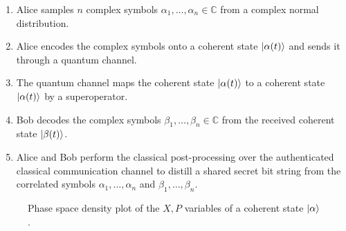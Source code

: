 \begin{enumerate}
	\item Alice samples $n$ complex symbols $\alpha_1,\dots,\alpha_n\in\mathbb{C}$ from a complex normal distribution.
	\item Alice encodes the complex symbols onto a coherent state $\ket{\alpha(t)}$ and sends it through a quantum channel.
	\item The quantum channel maps the coherent state $\ket{\alpha(t)}$ to a coherent state $\ket{\alpha(t)}$ by a superoperator.
	\item Bob decodes the complex symbols $\beta_1,\dots,\beta_n\in\mathbb{C}$ from the received coherent state $\ket{\beta(t)}$.
	\item Alice and Bob perform the classical post-processing over the authenticated classical communication channel to distill a shared secret bit string from the correlated symbols $\alpha_1,\dots,\alpha_n$ and $\beta_1,\dots,\beta_n$.
\end{enumerate}


\begin{figure}[htb]
	\centering
	
	\caption{Phase space density plot of the $X,P$ variables of a coherent state $\ket{\alpha}$.}
\end{figure}